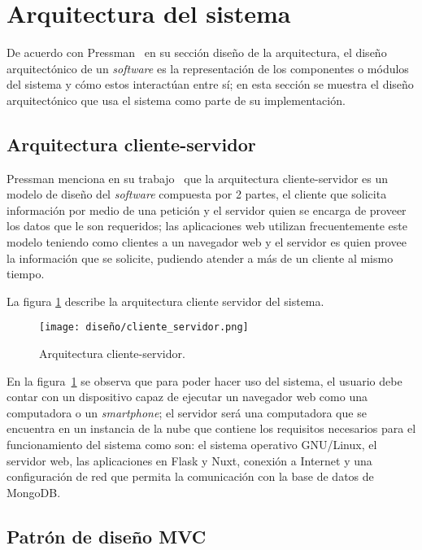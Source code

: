 \section{Arquitectura del sistema}

De acuerdo con Pressman~\cite{pressman_software_2005} en su sección diseño de la arquitectura, el diseño arquitectónico de un \textit{software} es la representación de los componentes o módulos del sistema y cómo estos interactúan entre sí; en esta sección se muestra el diseño arquitectónico que usa el sistema como parte de su implementación.

\subsection{Arquitectura cliente-servidor}

Pressman menciona en su trabajo~\cite{pressman_software_2005} que la arquitectura cliente-servidor es un modelo de diseño del \textit{software} compuesta por 2 partes, el cliente que solicita información por medio de una petición y el servidor quien se encarga de proveer los datos que le son requeridos; las aplicaciones web utilizan frecuentemente este modelo teniendo como clientes a un navegador web y el servidor es quien provee la información que se solicite, pudiendo atender a más de un cliente al mismo tiempo.

La figura \ref{img:arq_client_server} describe la arquitectura cliente servidor del sistema.

\begin{figure}[H]
    \centering
    \texttt{[image: diseño/cliente\_servidor.png]}
    \caption{Arquitectura cliente-servidor.}
    \label{img:arq_client_server}
\end{figure}


En la figura~\ref{img:arq_client_server} se observa que para poder hacer uso del sistema, el usuario debe contar con un dispositivo capaz de ejecutar un navegador web como una computadora o un \textit{smartphone}; el servidor será una computadora que se encuentra en un instancia de la nube que contiene los requisitos necesarios para el funcionamiento del sistema como son: el sistema operativo GNU/Linux, el servidor web, las aplicaciones en Flask y Nuxt, conexión a Internet y una configuración de red que permita la comunicación con la base de datos de MongoDB.


\subsection{Patrón de diseño MVC}

